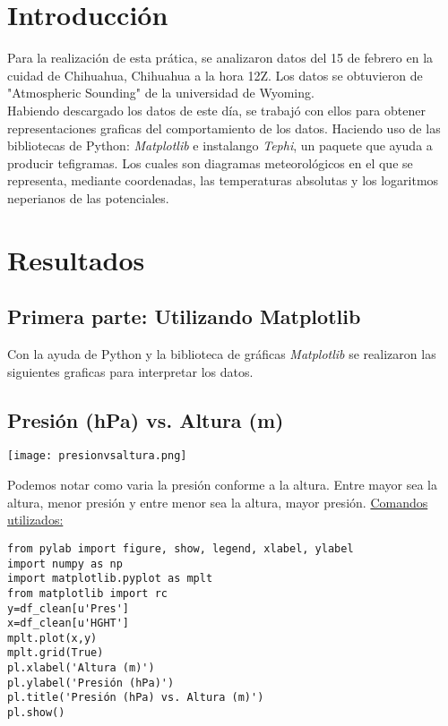 \documentclass[12pt]{article}
\begin{document}
\section{Introducción}
Para la realización de esta prática, se analizaron datos del 15 de febrero en la cuidad de Chihuahua, Chihuahua a la hora 12Z. Los datos se obtuvieron de "Atmospheric Sounding" de la universidad de Wyoming. \\
\linebreak Habiendo descargado los datos de este día, se trabajó con ellos para obtener representaciones graficas del comportamiento de los datos. Haciendo uso de las bibliotecas de Python: \textit{Matplotlib} e instalango \textit{Tephi}, un paquete que ayuda a producir tefigramas. Los cuales son diagramas meteorológicos en el que se representa, mediante coordenadas, las temperaturas absolutas y los logaritmos neperianos de las potenciales. 

\section*{Resultados}
\subsection{Primera parte: Utilizando Matplotlib}
Con la ayuda de Python y la biblioteca de gráficas \textit{Matplotlib} se realizaron las siguientes graficas para interpretar los datos. 

\pagebreak
\subsection*{Presión (hPa) vs. Altura (m)}
\begin{center}
\texttt{[image: presionvsaltura.png]}
\end{center}
Podemos notar como varia la presión conforme a la altura. Entre mayor sea la altura, menor presión y entre menor sea la altura, mayor presión. \linebreak
\underline{Comandos utilizados:}
\begin{verbatim}
from pylab import figure, show, legend, xlabel, ylabel
import numpy as np
import matplotlib.pyplot as mplt
from matplotlib import rc
y=df_clean[u'Pres']
x=df_clean[u'HGHT']
mplt.plot(x,y)
mplt.grid(True)
pl.xlabel('Altura (m)')
pl.ylabel('Presión (hPa)')
pl.title('Presión (hPa) vs. Altura (m)')
pl.show()

\end{verbatim}
\end{document}
